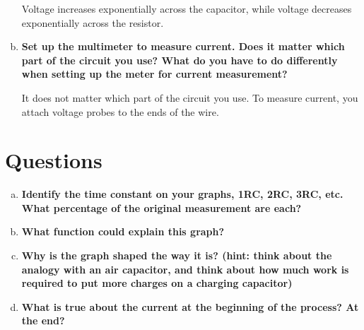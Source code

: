 \documentclass[article, 12pt]{article}
\begin{document}
\begin{enumerate}[a)]
        Voltage increases exponentially across the capacitor, while voltage decreases exponentially across the resistor.
        \item \textbf{Set up the multimeter to measure current. Does it matter which part of the circuit you use? What do you have to do differently when setting up the meter for current measurement?}
        
        It does not matter which part of the circuit you use. To measure current, you attach voltage probes to the ends of the wire.
    \end{enumerate}

    \section{Questions}
    \begin{enumerate}[a)]
        \item \textbf{Identify the time constant on your graphs, 1RC, 2RC, 3RC, etc.  What percentage of the original measurement are each?}
        \item \textbf{What function could explain this graph?}
        \item \textbf{Why is the graph shaped the way it is? (hint: think about the analogy with an air capacitor, and think about how much work is required to put more charges on a charging capacitor)}
        \item \textbf{What is true about the current at the beginning of the process? At the end?}
    \end{enumerate}
\end{document}

